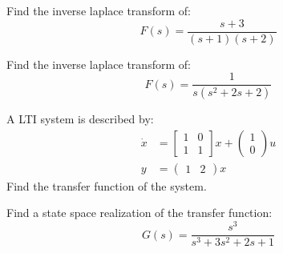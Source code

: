 \documentclass[11pt]{article}
\begin{document}
Find the inverse laplace transform of:
$$
F(s) = \frac{s + 3}{(s+1)(s+2)}
$$
\soln








Find the inverse laplace transform of:
$$
F(s) = \frac{1}{s(s^2 + 2s +2)}
$$
\soln








A LTI system is described by:
\begin{align*}
    \dot{x} &= \begin{bmatrix}
        1&0\\1&1
    \end{bmatrix}x + \begin{pmatrix}
        1\\0
    \end{pmatrix}u \\
    y &= \begin{pmatrix}
        1 & 2
    \end{pmatrix} x
\end{align*}
Find the transfer function of the system.

\soln





Find a state space realization of the transfer function:
$$
G(s) = \frac{s^3}{s^3 + 3s^2 + 2s + 1}
$$
\soln
\end{document}
